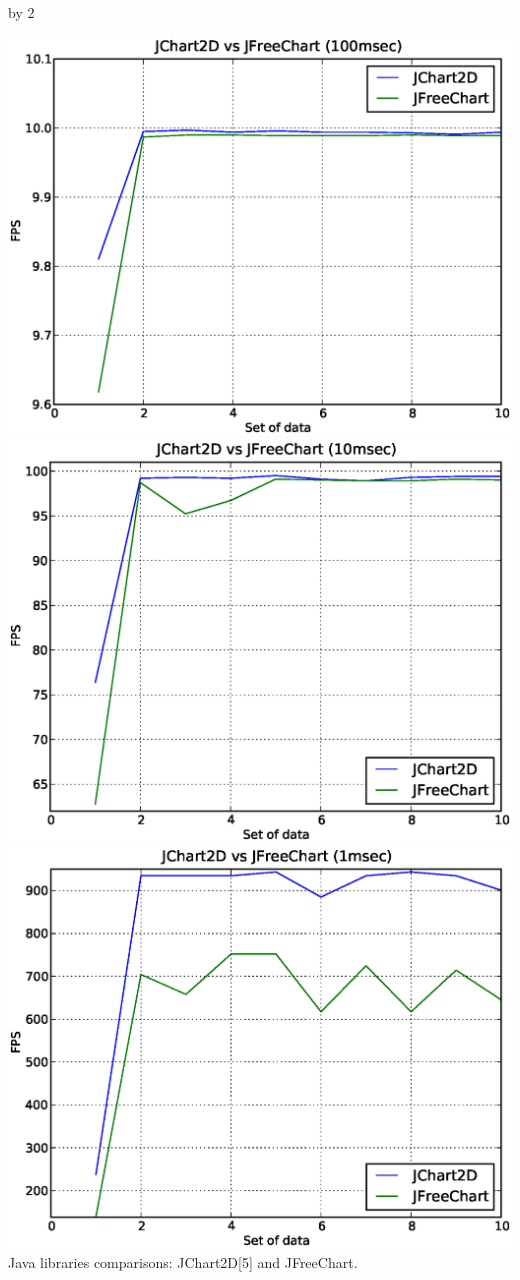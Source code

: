 \documentclass[11pt]{scrartcl}
\def\anzspalten{2}
\newlength{\kastenwidth}
\newenvironment{kasten}{
  \begin{lrbox}{\dummybox}
    \begin{minipage}{\linewidth}}
    {\end{minipage}
  \end{lrbox}
  \raisebox{-\depth}{\psshadowbox[cornersize=absolute,linearc=14pt,framesep=1em]{\usebox{\dummybox}}}\\[0.5em]}
\newenvironment{spalte}{
  \setlength\kastenwidth{1.2\textwidth}
  \divide\kastenwidth by \anzspalten
  \begin{minipage}[t]{\kastenwidth}}{\end{minipage}}
\begin{document}
\begin{lrbox}{\spalten}
{\begin{spalte}
\begin{kasten}
\begin{minipage}[t]{0.95\linewidth}
			\end{minipage} \vspace{0.25cm}

			\begin{minipage}[t]{0.95\linewidth}
				\begin{center}
				\includegraphics[width=0.30\linewidth, height=!]{../img/java-100}
				\includegraphics[width=0.30\linewidth, height=!]{../img/java-10}
				\includegraphics[width=0.30\linewidth, height=!]{../img/java-1}\\
				Java libraries comparisons: JChart2D[5] and JFreeChart.
				\end{center}
			\end{minipage}


\end{kasten}
\end{spalte}}
\end{lrbox}
\end{document}
